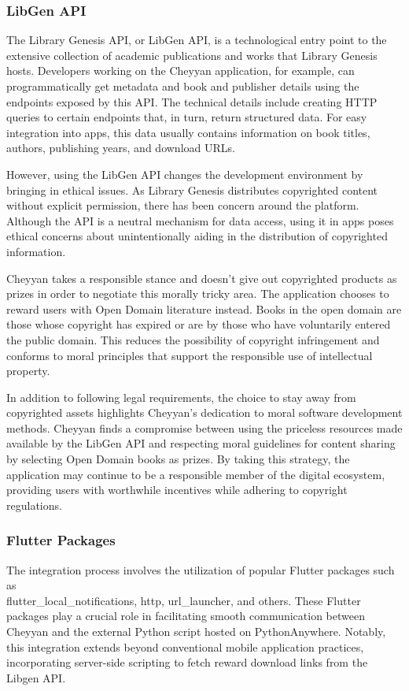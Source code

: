 \documentclass{l4proj}
\begin{document}
\subsubsection{LibGen API}
The Library Genesis API, or LibGen API, is a technological entry point to the extensive collection of academic publications and works that Library Genesis hosts. Developers working on the Cheyyan application, for example, can programmatically get metadata and book and publisher details using the endpoints exposed by this API. The technical details include creating HTTP queries to certain endpoints that, in turn, return structured data. For easy integration into apps, this data usually contains information on book titles, authors, publishing years, and download URLs.

However, using the LibGen API changes the development environment by bringing in ethical issues. As Library Genesis distributes copyrighted content without explicit permission, there has been concern around the platform. Although the API is a neutral mechanism for data access, using it in apps poses ethical concerns about unintentionally aiding in the distribution of copyrighted information.

Cheyyan takes a responsible stance and doesn't give out copyrighted products as prizes in order to negotiate this morally tricky area. The application chooses to reward users with Open Domain literature instead. Books in the open domain are those whose copyright has expired or are by those who have voluntarily entered the public domain. This reduces the possibility of copyright infringement and conforms to moral principles that support the responsible use of intellectual property.

In addition to following legal requirements, the choice to stay away from copyrighted assets highlights Cheyyan's dedication to moral software development methods. Cheyyan finds a compromise between using the priceless resources made available by the LibGen API and respecting moral guidelines for content sharing by selecting Open Domain books as prizes. By taking this strategy, the application may continue to be a responsible member of the digital ecosystem, providing users with worthwhile incentives while adhering to copyright regulations. \\


\subsubsection{Flutter Packages}
The integration process involves the utilization of popular Flutter packages such as \\flutter\_local\_notifications, http, url\_launcher, and others. These Flutter packages play a crucial role in facilitating smooth communication between Cheyyan and the external Python script hosted on PythonAnywhere. Notably, this integration extends beyond conventional mobile application practices, incorporating server-side scripting to fetch reward download links from the Libgen API.
\end{document}
